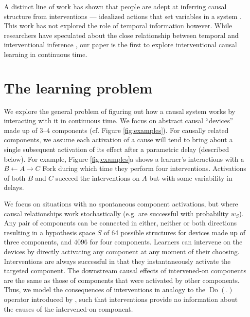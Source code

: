 \documentclass[10pt,letterpaper]{article}
\DeclareMathOperator*{\Do}{Do}
\newcommand{\ws}{w_S} %
\newcommand{\calm}{S} %
\begin{document}
A distinct line of work has shown that people are adept at inferring causal structure from interventions --- idealized actions that set variables in a system \citep[e.g.,][]{bramley2017neurath,coenen2015strategies}. This work has not explored the role of temporal information however. 
While researchers have speculated about the close relationship between temporal and interventional inference \citep[e.g.,][]{lagnado2004advantage}, our paper is the first to explore interventional causal learning in continuous time. 

\section{The learning problem}

We explore the general problem of figuring out how a causal system works by interacting with it in continuous time.
We focus on abstract causal ``devices'' made up of 3--4 components (cf. Figure \ref{fig:examples}).
For causally related components, we assume each activation of a cause will tend to bring about a single subsequent activation of its effect after a parametric delay (described below).  For example, Figure \ref{fig:examples}a shows a learner's interactions with a $B\leftarrow A \rightarrow C$ Fork during which time they perform four interventions.  Activations of both $B$ and $C$ succeed the interventions on $A$ but with some variability in delays.

We focus on situations with no spontaneous component activations, but where causal relationships work stochastically (e.g. are successful with probability $\ws$). Any pair of components can be connected in either, neither or both directions resulting in a hypothesis space $\calm$ of 64 possible structures for devices made up of three components, and 4096 for four components.  Learners can intervene on the devices by directly activating any component at any moment of their choosing. Interventions are always successful in that they instantaneously activate the targeted component. The downstream causal effects of intervened-on components are the same as those of components that were activated by other components. Thus, we model the consequences of interventions in analogy to the $\Do(.)$ operator introduced by \cite{pearl2000causality}, such that interventions provide no information about the causes of the intervened-on component.
\end{document}
